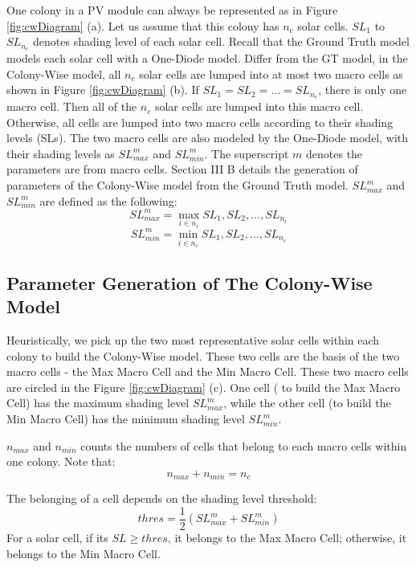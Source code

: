 One colony in a PV module can always be represented as in Figure \ref{fig:cwDiagram} (a). Let us assume that this colony has $n_c$ solar cells. $SL_1$ to $SL_{n_c}$ denotes shading level of each solar cell. Recall that the Ground Truth model models each solar cell with a One-Diode model. Differ from the GT model, in the Colony-Wise model, all $n_c$ solar cells are lumped into at most two macro cells as shown in Figure \ref{fig:cwDiagram} (b). If $SL_1 = SL_2 = \dots = SL_{n_c}$, there is only one macro cell. Then all of the $n_c$ solar cells are lumped into this macro cell. Otherwise, all cells are lumped into two macro cells according to their shading levels (SLs). The two macro cells are also modeled by the One-Diode model, with their shading levels as $SL_{max}^m$ and $SL_{min}^m$. The superscript $m$ denotes the parameters are from macro cells. Section III B details the generation of parameters of the Colony-Wise model from the Ground Truth model. $SL_{max}^m$ and $SL_{min}^m$ are defined as the following:
\begin{equation}\label{equ:slMax}
  SL_{max}^m = \max_{i \in n_c}{SL_1, SL_2,  \dots, SL_{n_c} }
\end{equation}
\begin{equation}\label{equ:slMin}
  SL_{min}^m = \min_{i \in n_c}{SL_1, SL_2,  \dots, SL_{n_c} }
\end{equation}
\subsection{Parameter Generation of The Colony-Wise Model}
Heuristically, we pick up the two most representative solar cells within each colony to build the Colony-Wise model. These two cells are the basis of the two macro cells - the Max Macro Cell and the Min Macro Cell. These two macro cells are circled in the Figure \ref{fig:cwDiagram} (c). One cell ( to build the Max Macro Cell) has the maximum shading level $SL_{max}^m$, while the other cell (to build the Min Macro Cell) has the minimum shading level $SL_{min}^m$.

$n_{max}$ and $n_{min}$  counts the numbers of cells that belong to each macro cells within one colony. Note that:
\begin{equation}\label{equ:minMaxEqu}
  n_{max} + n_{min} = n_c
\end{equation}

The belonging of a cell depends on the shading level threshold:
\begin{equation}\label{equ:thres}
  thres = \frac{1}{2}(SL_{max}^m+ SL_{min}^m )
\end{equation}
For a solar cell, if its $SL \ge thres$, it belongs to the Max Macro Cell; otherwise, it belongs to the Min Macro Cell.


